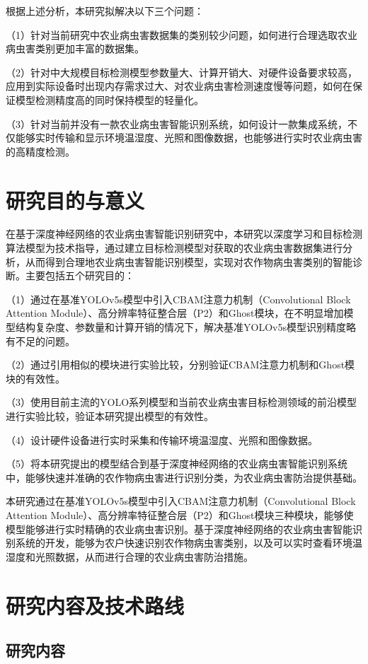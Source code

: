\documentclass[12pt, a4paper, twoside]{ctexart}
\begin{document}
根据上述分析，本研究拟解决以下三个问题：

（1）针对当前研究中农业病虫害数据集的类别较少问题，如何进行合理选取农业病虫害类别更加丰富的数据集。

（2）针对中大规模目标检测模型参数量大、计算开销大、对硬件设备要求较高，应用到实际设备时出现内存需求过大、对农业病虫害检测速度慢等问题，如何在保证模型检测精度高的同时保持模型的轻量化。

（3）针对当前并没有一款农业病虫害智能识别系统，如何设计一款集成系统，不仅能够实时传输和显示环境温湿度、光照和图像数据，也能够进行实时农业病虫害的高精度检测。


\section{研究目的与意义}

在基于深度神经网络的农业病虫害智能识别研究中，本研究以深度学习和目标检测算法模型为技术指导，通过建立目标检测模型对获取的农业病虫害数据集进行分析，从而得到合理地农业病虫害智能识别模型，实现对农作物病虫害类别的智能诊断。主要包括五个研究目的：

（1）通过在基准YOLOv5s模型中引入CBAM注意力机制（Convolutional Block Attention Module）、高分辨率特征整合层（P2）和Ghost模块，在不明显增加模型结构复杂度、参数量和计算开销的情况下，解决基准YOLOv5s模型识别精度略有不足的问题。

（2）通过引用相似的模块进行实验比较，分别验证CBAM注意力机制和Ghost模块的有效性。

（3）使用目前主流的YOLO系列模型和当前农业病虫害目标检测领域的前沿模型进行实验比较，验证本研究提出模型的有效性。

（4）设计硬件设备进行实时采集和传输环境温湿度、光照和图像数据。

（5）将本研究提出的模型结合到基于深度神经网络的农业病虫害智能识别系统中，能够快速并准确的农作物病虫害进行识别分类，为农业病虫害防治提供基础。

本研究通过在基准YOLOv5s模型中引入CBAM注意力机制（Convolutional Block Attention Module）、高分辨率特征整合层（P2）和Ghost模块三种模块，能够使模型能够进行实时精确的农业病虫害识别。基于深度神经网络的农业病虫害智能识别系统的开发，能够为农户快速识别农作物病虫害类别，以及可以实时查看环境温湿度和光照数据，从而进行合理的农业病虫害防治措施。


\section{研究内容及技术路线}


\subsection{研究内容}
\end{document}

